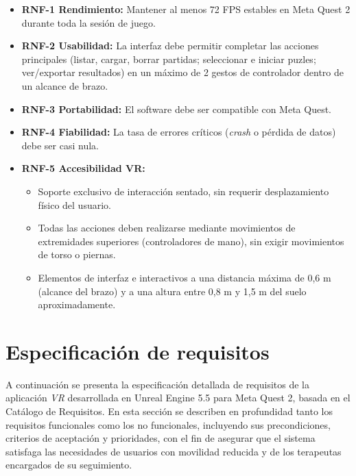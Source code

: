 \bigskip

\noindent
\begin{itemize}
  \item \textbf{RNF-1 Rendimiento:} Mantener al menos 72 FPS estables en Meta Quest 2 durante toda la sesión de juego.
  
  \item \textbf{RNF-2 Usabilidad:} La interfaz debe permitir completar las acciones principales (listar, cargar, borrar partidas; seleccionar e iniciar puzles; ver/exportar resultados) en un máximo de 2 gestos de controlador dentro de un alcance de brazo.
  
  \item \textbf{RNF-3 Portabilidad:} El software debe ser compatible con Meta Quest.
  
  \item \textbf{RNF-4 Fiabilidad:} La tasa de errores críticos (\textit{crash} o pérdida de datos) debe ser casi nula.
  
  \item \textbf{RNF-5 Accesibilidad VR:}  
    \begin{itemize}
      \item Soporte exclusivo de interacción sentado, sin requerir desplazamiento físico del usuario.  
      \item Todas las acciones deben realizarse mediante movimientos de extremidades superiores (controladores de mano), sin exigir movimientos de torso o piernas.  
      \item Elementos de interfaz e interactivos a una distancia máxima de 0,6 m (alcance del brazo) y a una altura entre 0,8 m y 1,5 m del suelo aproximadamente.  
    \end{itemize}
\end{itemize}
\section{Especificación de requisitos}
A continuación se presenta la especificación detallada de requisitos de la aplicación \emph{VR} desarrollada en Unreal Engine 5.5 para Meta Quest 2, basada en el Catálogo de Requisitos. En esta sección se describen en profundidad tanto los requisitos funcionales como los no funcionales, incluyendo sus precondiciones, criterios de aceptación y prioridades, con el fin de asegurar que el sistema satisfaga las necesidades de usuarios con movilidad reducida y de los terapeutas encargados de su seguimiento.

